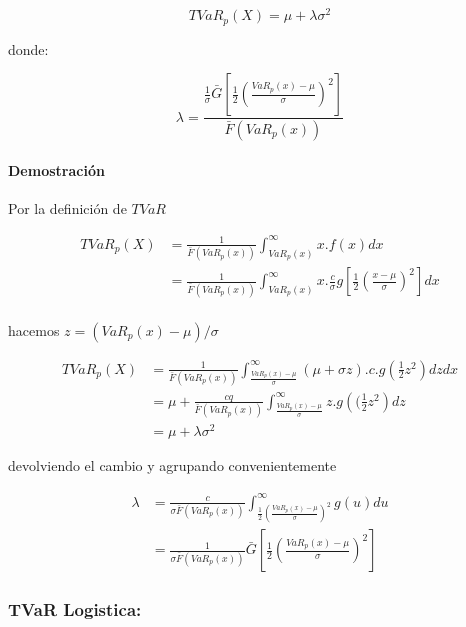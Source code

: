 \documentclass[10pt,]{article}
\begin{document}
\[TVaR_p(X)=\mu + \lambda \sigma^2\]

donde:

\[\lambda=\frac{\frac{1}{\sigma}\bar{G} \left[ \frac{1}{2} \left(\frac{VaR_p(x)-\mu}{\sigma}\right)^2\right]}{\bar{F}(VaR_p(x))}\]

\hypertarget{demostracion}{%
\paragraph{Demostración}\label{demostracion}}

Por la definición de \(TVaR\)

\[\begin{array}{rl} 
 TVaR_p(X) &\displaystyle =\frac{1}{\bar{F}(VaR_p(x))} \int_{VaR_p(x)}^{\infty}x.f(x) dx\\
 &\displaystyle =\frac{1}{\bar{F}(VaR_p(x))} \int_{VaR_p(x)}^{\infty}x.\frac{c}{\sigma}g\left[\frac{1}{2}\left(\frac{x-\mu}{\sigma}\right)^2\right]dx\\
\end{array}\]

hacemos \(z=(VaR_p(x)- \mu)/\sigma\)

\[\begin{array}{rl} 
TVaR_p(X) &\displaystyle =\frac{1}{\bar{F}(VaR_p(x))} \int_{\frac{VaR_p(x)-\mu}{\sigma}}^{\infty}(\mu + \sigma z).c.g\left(\frac{1}{2}z^2\right)dz dx\\
&\displaystyle =\mu + \frac{cq}{\bar{F}(VaR_p(x))}\int_{\frac{VaR_p(x)-\mu}{\sigma}}^{\infty}z.g\left((\frac{1}{2}z^2\right)dz\\  
&\displaystyle = \mu + \lambda \sigma^2
\end{array}\]

devolviendo el cambio y agrupando convenientemente

\[\begin{array}{rl}
\lambda &\displaystyle =\frac{c}{\sigma \bar{F}(VaR_p(x))} \int_{\frac{1}{2}(\frac{VaR_p(x)-\mu}{\sigma})^2}^{\infty} g(u) du\\
&\displaystyle =\frac{1}{\sigma \bar{F}(VaR_p(x))}\bar{G} \left[\frac{1}{2} \left(\frac{VaR_p(x)-\mu}{\sigma}\right)^2\right]
\end{array}\]

\hypertarget{tvar-logistica}{%
\subsubsection{\texorpdfstring{\textbf{TVaR
Logistica:}}{TVaR Logistica:}}\label{tvar-logistica}}
\end{document}
